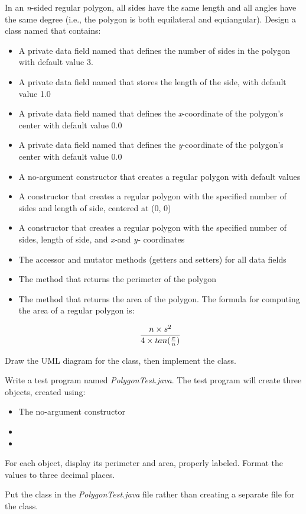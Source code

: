 \begin{exercise}

In an {\em n}-sided regular polygon, all sides have the same length and all angles have the same degree (i.e., the polygon is both equilateral and equiangular). Design a class named  that contains:
\begin{itemize}
    \item A private  data field named  that defines the number of sides in the polygon with default value 3.
    \item A private  data field named  that stores the length of the side, with default value 1.0
    \item A private  data field named  that defines the {\em x}-coordinate of the polygon's center with default value 0.0
    \item A private  data field named  that defines the {\em y}-coordinate of the polygon's center with default value 0.0
    \item A no-argument constructor that creates a regular polygon with default values
    \item A constructor that creates a regular polygon with the specified number of sides and length of side, centered at (0, 0)
    \item A constructor that creates a regular polygon with the specified number of sides, length of side, and {\em x-}and {\em y-} coordinates
    \item The accessor and mutator methods (getters and setters) for all data fields
    \item The method  that returns the perimeter of the polygon
    \item The method  that returns the area of the polygon. The formula for computing the area of a regular polygon is:
    
    \begin{equation*}
    {{n \times s^2} \over {4 \times tan({\pi \over n})}}
    \end{equation*}
    
\end{itemize}

Draw the UML diagram for the class, then implement the class.

Write a test program named {\em PolygonTest.java}. The test program will create three  objects, created using:
\begin{itemize}
    \item The no-argument constructor
    \item {}
    \item {}
\end{itemize}

For each object, display its perimeter and area, properly labeled. Format the values to three decimal places.

Put the  class in the {\em PolygonTest.java} file rather than creating a separate file for the class. 
\end{exercise}

